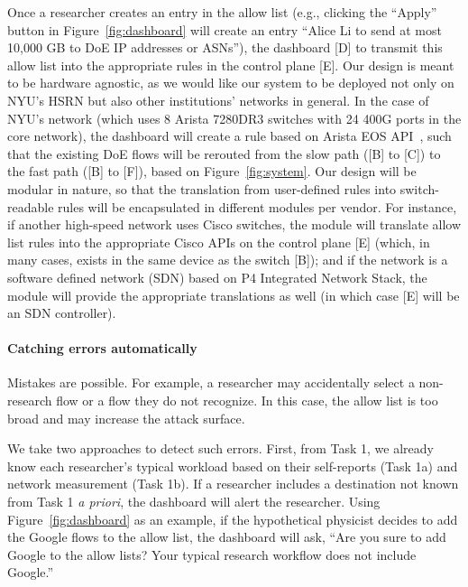 Once a researcher creates an entry in the allow list (e.g., clicking the ``Apply'' button in Figure~\ref{fig:dashboard} will create an entry ``Alice Li to send at most 10,000 GB to DoE IP addresses or ASNs''), the dashboard [D] to transmit this allow list into the appropriate rules in the control plane [E]. Our design is meant to be hardware agnostic, as we would like our system to be deployed not only on NYU's HSRN but also other institutions' networks in general. In the case of NYU's network (which uses 8 Arista 7280DR3 switches with 24 400G ports in the core network), the dashboard will create a rule based on Arista EOS API~\cite{aristaswitch}, such that the existing DoE flows will be rerouted from the slow path ([B] to [C]) to the fast path ([B] to [F]), based on Figure~\ref{fig:system}. Our design will be modular in nature, so that the translation from user-defined rules into switch-readable rules will be encapsulated in different modules per vendor. For instance, if another high-speed network uses Cisco switches, the module will translate allow list rules into the appropriate Cisco APIs on the control plane [E] (which, in many cases, exists in the same device as the switch [B]); and if the network is a software defined network (SDN) based on P4 Integrated Network Stack, the module will provide the appropriate translations as well (in which case [E] will be an SDN controller).




\paragraph{Catching errors automatically}
Mistakes are possible. For example, a researcher may accidentally select a non-research flow or a flow they do not recognize. In this case, the allow list is too broad and may increase the attack surface.

We take two approaches to detect such errors. First, from Task 1, we already know each researcher's typical workload based on their self-reports (Task 1a) and network measurement (Task 1b). If a researcher includes a destination not known from Task 1 \textit{a priori}, the dashboard will alert the researcher. Using Figure~\ref{fig:dashboard} as an example, if the hypothetical physicist decides to add the Google flows to the allow list, the dashboard will ask, ``Are you sure to add Google to the allow lists? Your typical research workflow does not include Google.''

